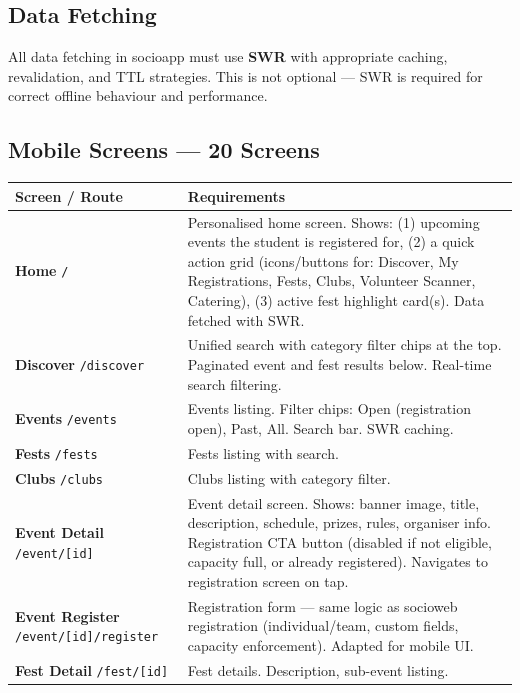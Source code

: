 \documentclass[12pt,a4paper]{article}
\begin{document}
\subsection{Data Fetching}

All data fetching in socioapp must use \textbf{SWR} with appropriate caching, revalidation, and TTL strategies. This is not optional — SWR is required for correct offline behaviour and performance.

\subsection{Mobile Screens — 20 Screens}

\begin{longtable}{L{5cm} X}
\toprule
{}
\textbf{Screen / Route} & \textbf{Requirements} \\
\midrule
\endhead
\textbf{Home} \texttt{/} & Personalised home screen. Shows: (1) upcoming events the student is registered for, (2) a quick action grid (icons/buttons for: Discover, My Registrations, Fests, Clubs, Volunteer Scanner, Catering), (3) active fest highlight card(s). Data fetched with SWR. \\
\addlinespace
\textbf{Discover} \texttt{/discover} & Unified search with category filter chips at the top. Paginated event and fest results below. Real-time search filtering. \\
\addlinespace
\textbf{Events} \texttt{/events} & Events listing. Filter chips: Open (registration open), Past, All. Search bar. SWR caching. \\
\addlinespace
\textbf{Fests} \texttt{/fests} & Fests listing with search. \\
\addlinespace
\textbf{Clubs} \texttt{/clubs} & Clubs listing with category filter. \\
\addlinespace
\textbf{Event Detail} \texttt{/event/[id]} & Event detail screen. Shows: banner image, title, description, schedule, prizes, rules, organiser info. Registration CTA button (disabled if not eligible, capacity full, or already registered). Navigates to registration screen on tap. \\
\addlinespace
\textbf{Event Register} \texttt{/event/[id]/register} & Registration form — same logic as socioweb registration (individual/team, custom fields, capacity enforcement). Adapted for mobile UI. \\
\addlinespace
\textbf{Fest Detail} \texttt{/fest/[id]} & Fest details. Description, sub-event listing. \\

\end{longtable}
\end{document}
